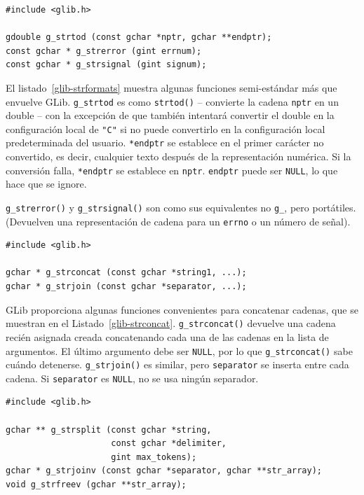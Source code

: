 \begin{lstlisting}[float, caption={Conversiones de cadenas}, label=glib-strformats]
#include <glib.h>

gdouble g_strtod (const gchar *nptr, gchar **endptr);
const gchar * g_strerror (gint errnum);
const gchar * g_strsignal (gint signum);
\end{lstlisting}

El listado~\ref{glib-strformats} muestra algunas funciones semi-estándar más que envuelve GLib. \lstinline{g_strtod} es como \lstinline{strtod()} -- convierte la cadena \lstinline{nptr} en un double -- con la excepción de que también intentará convertir el double en la configuración local de \lstinline{"C"} si no puede convertirlo en la configuración local predeterminada del usuario. \lstinline{*endptr} se establece en el primer carácter no convertido, es decir, cualquier texto después de la representación numérica. Si la conversión falla, \lstinline{*endptr} se establece en \lstinline{nptr}. \lstinline{endptr} puede ser \lstinline{NULL}, lo que hace que se ignore.

\lstinline{g_strerror()} y \lstinline{g_strsignal()} son como sus equivalentes no \lstinline{g_}, pero portátiles. (Devuelven una representación de cadena para un \lstinline{errno} o un número de señal).

\begin{lstlisting}[float, caption={Concatenar cadenas}, label=glib-strconcat]
#include <glib.h>

gchar * g_strconcat (const gchar *string1, ...);
gchar * g_strjoin (const gchar *separator, ...);
\end{lstlisting}

GLib proporciona algunas funciones convenientes para concatenar cadenas, que se muestran en el Listado~\ref{glib-strconcat}. \lstinline{g_strconcat()} devuelve una cadena recién asignada creada concatenando cada una de las cadenas en la lista de argumentos. El último argumento debe ser \lstinline{NULL}, por lo que \lstinline{g_strconcat()} sabe cuándo detenerse. \lstinline{g_strjoin()} es similar, pero \lstinline{separator} se inserta entre cada cadena. Si \lstinline {separator} es \lstinline{NULL}, no se usa ningún separador.

\begin{lstlisting}[float, caption={Manipulación de vectores de cadena terminados en \lstinline{NULL}}, label=glib-strvector]
#include <glib.h>

gchar ** g_strsplit (const gchar *string,
                     const gchar *delimiter,
                     gint max_tokens);
gchar * g_strjoinv (const gchar *separator, gchar **str_array);
void g_strfreev (gchar **str_array);
\end{lstlisting}

